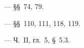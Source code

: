\begin{lab:literature}

	\item \SivuhinIII~--- \S\S~74, 79.

	\item \Kalashnikov~--- \S\S~110, 111, 118, 119.

	\item \KingLokOlh~--- Ч.~II, гл.~5, \S~5.3.

\end{lab:literature}
